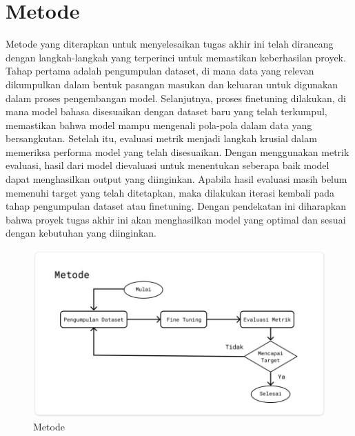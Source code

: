\section{Metode}

\textit{}

Metode yang diterapkan untuk menyelesaikan tugas akhir ini telah dirancang dengan langkah-langkah yang terperinci untuk memastikan keberhasilan proyek. Tahap pertama adalah pengumpulan dataset, di mana data yang relevan dikumpulkan dalam bentuk pasangan masukan dan keluaran untuk digunakan dalam proses pengembangan model. Selanjutnya, proses finetuning dilakukan, di mana model bahasa disesuaikan dengan dataset baru yang telah terkumpul, memastikan bahwa model mampu mengenali pola-pola dalam data yang bersangkutan. Setelah itu, evaluasi metrik menjadi langkah krusial dalam memeriksa performa model yang telah disesuaikan. Dengan menggunakan metrik evaluasi, hasil dari model dievaluasi untuk menentukan seberapa baik model dapat menghasilkan output yang diinginkan. Apabila hasil evaluasi masih belum memenuhi target yang telah ditetapkan, maka dilakukan iterasi kembali pada tahap pengumpulan dataset atau finetuning. Dengan pendekatan ini diharapkan bahwa proyek tugas akhir ini akan menghasilkan model yang optimal dan sesuai dengan kebutuhan yang diinginkan.


\begin{figure} [H] \centering
  \includegraphics[scale=0.7]{gambar/metode.jpg}
  \caption{Metode}
\end{figure}


